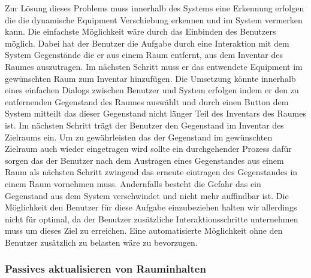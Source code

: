 Zur Lösung dieses Problems muss innerhalb des Systems eine Erkennung erfolgen
die die dynamische Equipment Verschiebung erkennen und im System vermerken
kann. Die einfachste Möglichkeit wäre durch das Einbinden des Benutzers
möglich. Dabei hat der Benutzer die Aufgabe durch eine Interaktion mit dem
System Gegenstände die er aus einem Raum entfernt, aus dem Inventar des Raumes
auszutragen. Im nächsten Schritt muss er das entwendete Equipment im
gewünschten Raum zum Inventar hinzufügen. Die Umsetzung könnte innerhalb eines
einfachen Dialogs zwischen Benutzer und System erfolgen indem er den zu
entfernenden Gegenstand des Raumes auswählt und durch \zB einen Button dem
System mitteilt das dieser Gegenstand nicht länger Teil des Inventars des
Raumes ist. Im nächsten Schritt trägt der Benutzer den Gegenstand im Inventar
des Zielraums ein.
Um zu gewährleisten das der Gegenstand im gewünschten Zielraum auch wieder
eingetragen wird sollte ein durchgehender Prozess dafür sorgen das der Benutzer
nach dem Austragen eines Gegenstandes aus einem Raum als nächsten Schritt
zwingend das erneute eintragen des Gegenstandes in einem Raum vornehmen muss.
Andernfalls besteht die Gefahr das ein Gegenstand aus dem System verschwindet
und nicht mehr auffindbar ist.
Die Möglichkeit den Benutzer für diese Aufgabe einzubeziehen halten wir
allerdings nicht für optimal, da der Benutzer zusätzliche Interaktionsschritte
unternehmen muss um dieses Ziel zu erreichen. Eine automatisierte Möglichkeit
ohne den Benutzer zusätzlich zu belasten wäre zu bevorzugen.

\subsubsection{Passives aktualisieren von Rauminhalten}
\label{sec:Passives aktualisieren von Rauminhalten}

